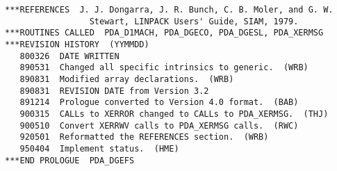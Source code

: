 \begin{verbatim}
***REFERENCES  J. J. Dongarra, J. R. Bunch, C. B. Moler, and G. W.
                 Stewart, LINPACK Users' Guide, SIAM, 1979.
***ROUTINES CALLED  PDA_D1MACH, PDA_DGECO, PDA_DGESL, PDA_XERMSG
***REVISION HISTORY  (YYMMDD)
   800326  DATE WRITTEN
   890531  Changed all specific intrinsics to generic.  (WRB)
   890831  Modified array declarations.  (WRB)
   890831  REVISION DATE from Version 3.2
   891214  Prologue converted to Version 4.0 format.  (BAB)
   900315  CALLs to XERROR changed to CALLs to PDA_XERMSG.  (THJ)
   900510  Convert XERRWV calls to PDA_XERMSG calls.  (RWC)
   920501  Reformatted the REFERENCES section.  (WRB)
   950404  Implement status.  (HME)
***END PROLOGUE  PDA_DGEFS
\end{verbatim}









